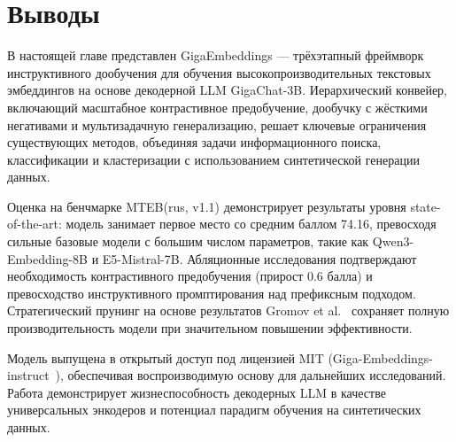 \section{Выводы}\label{sec:ge_conclusions}

В настоящей главе представлен GigaEmbeddings --- трёхэтапный фреймворк инструктивного дообучения для обучения высокопроизводительных текстовых эмбеддингов на основе декодерной LLM GigaChat-3B. Иерархический конвейер, включающий масштабное контрастивное предобучение, дообучку с жёсткими негативами и мультизадачную генерализацию, решает ключевые ограничения существующих методов, объединяя задачи информационного поиска, классификации и кластеризации с использованием синтетической генерации данных.

Оценка на бенчмарке MTEB(rus, v1.1) демонстрирует результаты уровня state-of-the-art: модель занимает первое место со средним баллом 74.16, превосходя сильные базовые модели с большим числом параметров, такие как Qwen3-Embedding-8B и E5-Mistral-7B. Абляционные исследования подтверждают необходимость контрастивного предобучения (прирост 0.6 балла) и превосходство инструктивного промптирования над префиксным подходом. Стратегический прунинг на основе результатов Gromov et al.~\cite{gromov2025unreasonable} сохраняет полную производительность модели при значительном повышении эффективности.

Модель выпущена в открытый доступ под лицензией MIT (Giga-Embeddings-instruct~\cite{gigaembeddings_hf}), обеспечивая воспроизводимую основу для дальнейших исследований. Работа демонстрирует жизнеспособность декодерных LLM в качестве универсальных энкодеров и потенциал парадигм обучения на синтетических данных.
